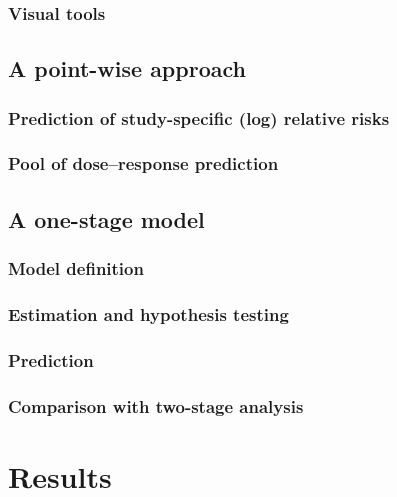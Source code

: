 \documentclass[11pt,a4paper,twoside,openany]{book}\usepackage{knitr}
\begin{document}
{\subsection{Visual tools}


\section{A point-wise approach}

\subsection{Prediction of study-specific (log) relative risks}

\subsection{Pool of dose--response prediction}


\section{A one-stage model}

\subsection{Model definition}

\subsection{Estimation and hypothesis testing}

\subsection{Prediction}

\subsection{Comparison with two-stage analysis}


%

\chapter{Results}




}
\end{document}
